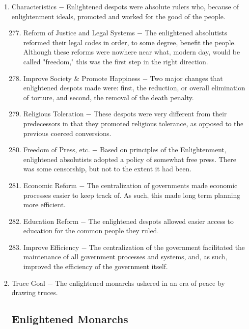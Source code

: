\documentclass[12pt]{article}
\begin{document}
\begin{enumerate}
\item Characteristics $-$ Enlightened despots were absolute rulers who, because of enlightenment ideals, promoted and worked for the good of the people.

\begin{enumerate}[label=\arabic{*}.]
\setcounter{enumii}{276}

\item Reform of Justice and Legal Systems $-$ The enlightened absolutists reformed their legal codes in order, to some degree, benefit the people. Although these reforms were nowhere near what, modern day, would be called "freedom," this was the first step in the right direction.

\item Improve Society \& Promote Happiness $-$ Two major changes that enlightened despots made were: first, the reduction, or overall elimination of torture, and second, the removal of the death penalty.

\item Religious Toleration $-$ These despots were very different from their predecessors in that they promoted religious tolerance, as opposed to the previous coerced conversions.

\item Freedom of Press, etc. $-$ Based on principles of the Enlightenment, enlightened absolutists adopted a policy of somewhat free press. There was some censorship, but not to the extent it had been.

\item Economic Reform $-$ The centralization of governments made economic processes easier to keep track of. As such, this made long term planning more efficient.

\item Education Reform $-$ The enlightened despots allowed easier access to education for the common people they ruled.

\item Improve Efficiency $-$ The centralization of the government facilitated the maintenance of all government processes and systems, and, as such, improved the efficiency of the government itself.


\end{enumerate}
\setcounter{enumi}{283}

\item Truce Goal $-$ The enlightened monarchs ushered in an era of peace by drawing truces. 

\subsection{Enlightened Monarchs}


\end{enumerate}
\end{document}
